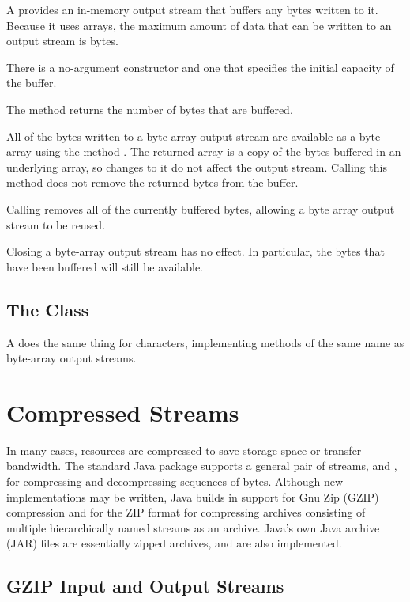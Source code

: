 A  provides an in-memory output stream
that buffers any bytes written to it.  Because it uses arrays, the
maximum amount of data that can be written to an output stream is
 bytes.

There is a no-argument constructor and one that specifies the initial
capacity of the buffer.  

The method  returns the number of bytes that are buffered.

All of the bytes written to a byte array output stream are available
as a byte array using the method .  The returned
array is a copy of the bytes buffered in an underlying array, so
changes to it do not affect the output stream.  Calling this method
does not remove the returned bytes from the buffer.

Calling  removes all of the currently buffered bytes,
allowing a byte array output stream to be reused.  

Closing a byte-array output stream has no effect.  In particular, the
bytes that have been buffered will still be available.

\subsection{The  Class}

A  does the same thing for characters,
implementing methods of the same name as byte-array output streams.


\section{Compressed Streams}

In many cases, resources are compressed to save storage space or
transfer bandwidth.  The standard Java package 
supports a general pair of streams,  and
, for compressing and decompressing
sequences of bytes.  Although new implementations may be written, Java
builds in support for Gnu Zip (GZIP) compression and for the ZIP
format for compressing archives consisting of multiple hierarchically
named streams as an archive.  Java's own Java archive (JAR) files are
essentially zipped archives, and are also implemented.   

\subsection{GZIP Input and Output Streams}

